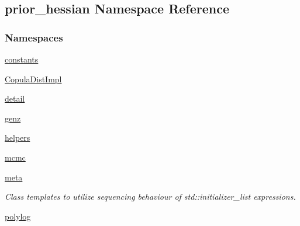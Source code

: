 \hypertarget{namespaceprior__hessian}{}\subsection{prior\+\_\+hessian Namespace Reference}
\label{namespaceprior__hessian}
\subsubsection*{Namespaces}
\begin{DoxyCompactItemize}
\item 
 \hyperlink{namespaceprior__hessian_1_1constants}{constants}
\item 
 \hyperlink{namespaceprior__hessian_1_1CopulaDistImpl}{Copula\+Dist\+Impl}
\item 
 \hyperlink{namespaceprior__hessian_1_1detail}{detail}
\item 
 \hyperlink{namespaceprior__hessian_1_1genz}{genz}
\item 
 \hyperlink{namespaceprior__hessian_1_1helpers}{helpers}
\item 
 \hyperlink{namespaceprior__hessian_1_1mcmc}{mcmc}
\item 
 \hyperlink{namespaceprior__hessian_1_1meta}{meta}
\begin{DoxyCompactList}\small\item\em Class templates to utilize sequencing behaviour of std\+::initializer\+\_\+list expressions. \end{DoxyCompactList}\item 
 \hyperlink{namespaceprior__hessian_1_1polylog}{polylog}
\end{DoxyCompactItemize}
